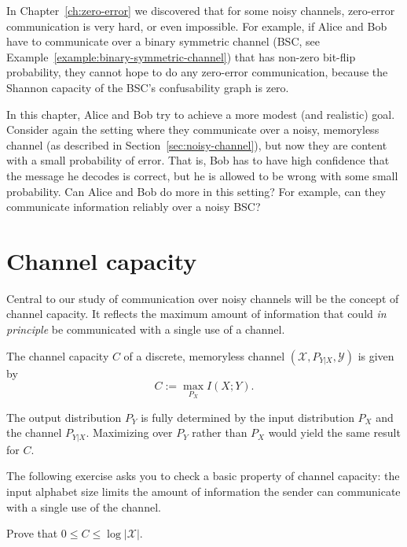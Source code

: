 

In Chapter~\ref{ch:zero-error} we discovered that for some noisy channels, zero-error communication is very hard, or even impossible. For example, if Alice and Bob have to communicate over a binary symmetric channel (BSC, see Example~\ref{example:binary-symmetric-channel}) that has non-zero bit-flip probability, they cannot hope to do any zero-error communication, because the Shannon capacity of the BSC's confusability graph is zero.

In this chapter, Alice and Bob try to achieve a more modest (and realistic) goal. Consider again the setting where they communicate over a noisy, memoryless channel (as described in Section~\ref{sec:noisy-channel}), but now they are content with a small probability of error. That is, Bob has to have high confidence that the message he decodes is correct, but he is allowed to be wrong with some small probability. Can Alice and Bob do more in this setting? For example, can they communicate information reliably over a noisy BSC?

\section{Channel capacity}
Central to our study of communication over noisy channels will be the concept of channel capacity. It reflects the maximum amount of information that could \emph{in principle} be communicated with a single use of a channel.

\begin{definition}
The channel capacity $C$ of a discrete, memoryless channel $(\mathcal{X}, P_{Y|X}, \mathcal{Y})$ is given by
\[
C:= \max_{P_X} I(X;Y).
\]
\end{definition}
The output distribution $P_Y$ is fully determined by the input distribution $P_X$ and the channel $P_{Y|X}$. Maximizing over $P_Y$ rather than $P_X$ would yield the same result for $C$. 

The following exercise asks you to check a basic property of channel capacity: the input alphabet size limits the amount of information the sender can communicate with a single use of the channel.

\begin{exercise}
Prove that $0 \leq C \leq \log |\mathcal{X}|$.
\end{exercise}

